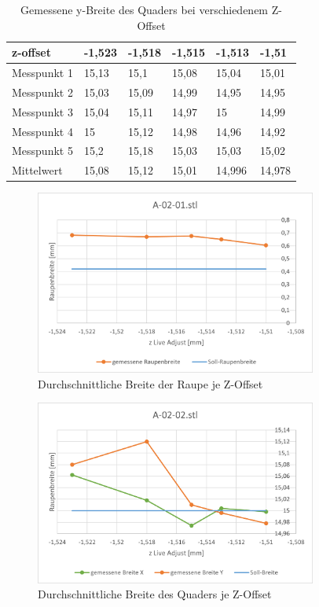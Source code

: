 \documentclass[a4paper,12pt,bibtotocnumbered]{scrartcl}
\numberwithin{equation}{section} %
\begin{document}
\begin{table}[H]
\centering
\begin{tabular}{|l|l|l|l|l|l|}
\hline
z-offset    & -1,523 & -1,518 & -1,515 & -1,513 & -1,51  \\ \hline
Messpunkt 1 & 15,13  & 15,1   & 15,08  & 15,04  & 15,01  \\ \hline
Messpunkt 2 & 15,03  & 15,09  & 14,99  & 14,95  & 14,95  \\ \hline
Messpunkt 3 & 15,04  & 15,11  & 14,97  & 15     & 14,99  \\ \hline
Messpunkt 4 & 15     & 15,12  & 14,98  & 14,96  & 14,92  \\ \hline
Messpunkt 5 & 15,2   & 15,18  & 15,03  & 15,03  & 15,02  \\ \hline
Mittelwert  & 15,08  & 15,12  & 15,01  & 14,996 & 14,978 \\ \hline
\end{tabular}
\caption{Gemessene y-Breite des Quaders bei verschiedenem Z-Offset}
\label{tab:y-achse}
\end{table}


\begin{figure}[H]
\centerline{\includegraphics[width=350px]{./images/raupe.png}}
\caption{Durchschnittliche Breite der Raupe je Z-Offset}
\label{fig:raupe_Diagramm}
\end{figure}


\begin{figure}[H]
\centerline{\includegraphics[width=350px]{./images/quader.png}}
\caption{Durchschnittliche Breite des Quaders je Z-Offset}
\label{fig:quader_Diagramm}
\end{figure}
\end{document}
